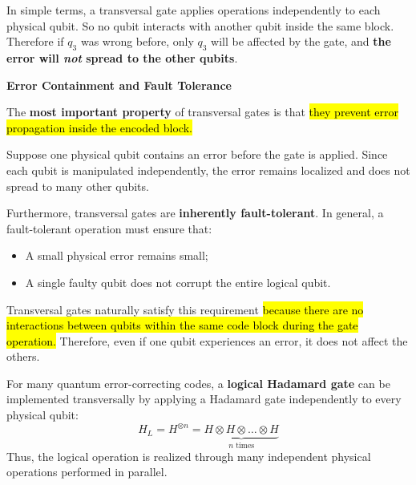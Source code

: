 \highspace
In simple terms, a transversal gate applies operations independently to each physical qubit. So no qubit interacts with another qubit inside the same block. Therefore if $q_3$ was wrong before, only $q_3$ will be affected by the gate, and \textbf{the error will \emph{not} spread to the other qubits}.

\newpage

\begin{flushleft}
    \textcolor{Green3}{ \textbf{Error Containment and Fault Tolerance}}
\end{flushleft}
The \textbf{most important property} of transversal gates is that \hl{they prevent error propagation inside the encoded block.}

\highspace
Suppose one physical qubit contains an error before the gate is applied. Since each qubit is manipulated independently, the error remains localized and does not spread to many other qubits.

\highspace
Furthermore, transversal gates are \textbf{inherently fault-tolerant}. In general, a fault-tolerant operation must ensure that:
\begin{itemize}
    \item A small physical error remains small;
    \item A single faulty qubit does not corrupt the entire logical qubit.
\end{itemize}
Transversal gates naturally satisfy this requirement \hl{because there are no interactions between qubits within the same code block during the gate operation.} Therefore, even if one qubit experiences an error, it does not affect the others.

\highspace
\begin{examplebox}\label{ex:logical-hadamard}
    For many quantum error-correcting codes, a \textbf{logical Hadamard gate} can be implemented transversally by applying a Hadamard gate independently to every physical qubit:
    \begin{equation*}
        H_L = H^{\otimes n} = \underbrace{H \otimes H \otimes \ldots \otimes H}_{n \text{ times}}
    \end{equation*}
    Thus, the logical operation is realized through many independent physical operations performed in parallel.
\end{examplebox}

